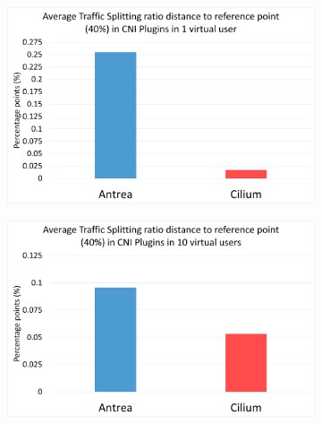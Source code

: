 \begin{figure}[H]
    \centering
    \begin{subfigure}[b]{0.48\textwidth}
        \includegraphics[width=\textwidth]{plots/traffic-splitting/time_window_5_1vu_reference_cloud.png}
        \label{fig:reference_1vu}
        \caption{}
    \end{subfigure}
    \begin{subfigure}[b]{0.48\textwidth}
        \includegraphics[width=\textwidth]{plots/traffic-splitting/time_window_5_10vu_reference_cloud.png}
        \label{fig:reference_10vu}
        \caption{}
    \end{subfigure}

    \vspace{0.5cm}


\end{figure}
